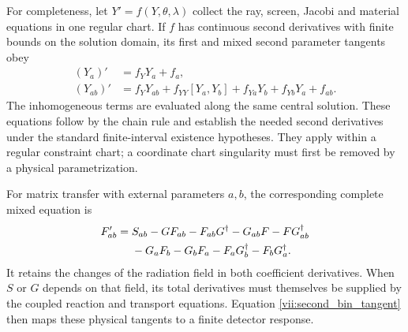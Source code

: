 For completeness, let $Y'=f(Y,\theta,\lambda)$ collect the ray, screen, Jacobi and material equations in one regular chart. If $f$ has continuous second derivatives with finite bounds on the solution domain, its first and mixed second parameter tangents obey
\begin{align}
(Y_a)'&=f_Y Y_a+f_a,\label{vii:general_first_tangent}\\
(Y_{ab})'&=f_Y Y_{ab}+f_{YY}[Y_a,Y_b]+f_{Ya}Y_b+f_{Yb}Y_a+f_{ab}.\label{vii:general_second_tangent}
\end{align}
The inhomogeneous terms are evaluated along the same central solution. These equations follow by the chain rule and establish the needed second derivatives under the standard finite-interval existence hypotheses. They apply within a regular constraint chart; a coordinate chart singularity must first be removed by a physical parametrization.

For matrix transfer with external parameters $a,b$, the corresponding complete mixed equation is
\begin{align}\label{vii:second_transfer_tangent}
F_{ab}'={}&S_{ab}-GF_{ab}-F_{ab}G^\dagger-G_{ab}F-FG_{ab}^\dagger\notag\\
&-G_aF_b-G_bF_a-F_aG_b^\dagger-F_bG_a^\dagger.
\end{align}
It retains the changes of the radiation field in both coefficient derivatives. When $S$ or $G$ depends on that field, its total derivatives must themselves be supplied by the coupled reaction and transport equations. Equation \eqref{vii:second_bin_tangent} then maps these physical tangents to a finite detector response.

